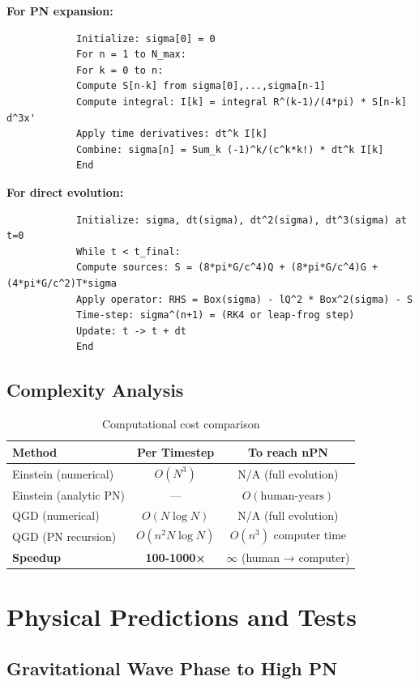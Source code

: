 \documentclass[11pt,a4paper]{article}
\theoremstyle{definition}
\theoremstyle{remark}
\begin{document}
		\textbf{For PN expansion:}
		
		\begin{verbatim}
			Initialize: sigma[0] = 0
			For n = 1 to N_max:
			For k = 0 to n:
			Compute S[n-k] from sigma[0],...,sigma[n-1]
			Compute integral: I[k] = integral R^(k-1)/(4*pi) * S[n-k] d^3x'
			Apply time derivatives: dt^k I[k]
			Combine: sigma[n] = Sum_k (-1)^k/(c^k*k!) * dt^k I[k]
			End
		\end{verbatim}
		
		\textbf{For direct evolution:}
		
		\begin{verbatim}
			Initialize: sigma, dt(sigma), dt^2(sigma), dt^3(sigma) at t=0
			While t < t_final:
			Compute sources: S = (8*pi*G/c^4)Q + (8*pi*G/c^4)G + (4*pi*G/c^2)T*sigma
			Apply operator: RHS = Box(sigma) - lQ^2 * Box^2(sigma) - S
			Time-step: sigma^(n+1) = (RK4 or leap-frog step)
			Update: t -> t + dt
			End
		\end{verbatim}
		
		\subsection{Complexity Analysis}
		
		\begin{table}[h]
			\centering
			\caption{Computational cost comparison}
			\begin{tabular}{@{}lcc@{}}
				\toprule
				\textbf{Method} & \textbf{Per Timestep} & \textbf{To reach nPN} \\
				\midrule
				Einstein (numerical) & $O(N^3)$ & N/A (full evolution) \\
				Einstein (analytic PN) & --- & $O(\text{human-years})$ \\
				QGD (numerical) & $O(N\log N)$ & N/A (full evolution) \\
				QGD (PN recursion) & $O(n^2 N\log N)$ & $O(n^3)$ computer time \\
				\midrule
				\textbf{Speedup} & \textbf{100-1000×} & \textbf{$\infty$} (human → computer) \\
				\bottomrule
			\end{tabular}
		\end{table}
		
		\section{Physical Predictions and Tests}
		
		\subsection{Gravitational Wave Phase to High PN}
		
\end{document}
